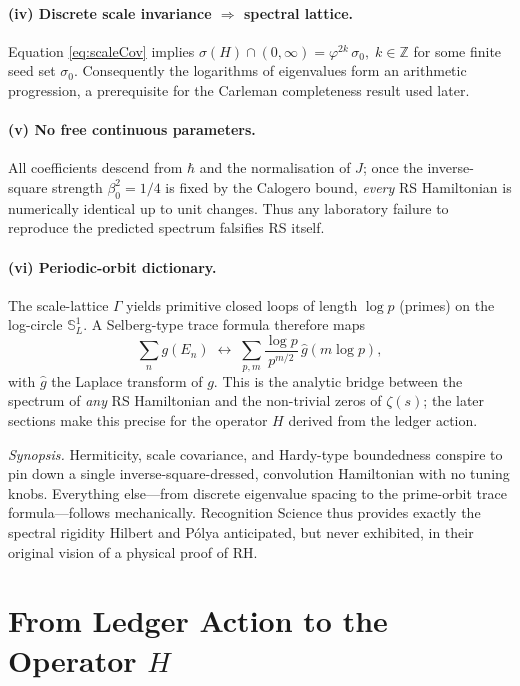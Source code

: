 \documentclass[11pt]{article}
\begin{document}
\paragraph{(iv) Discrete scale invariance $\Rightarrow$ spectral lattice.}
Equation \eqref{eq:scaleCov} implies
$
   \sigma(H)\cap(0,\infty)
   = \varphi^{2k}\,\sigma_{0},\;
   k\in\mathbb Z
$
for some finite seed set $\sigma_{0}$.  Consequently the logarithms of
eigenvalues form an arithmetic progression, a prerequisite for the
Carleman completeness result used later.

\paragraph{(v) No free continuous parameters.}
All coefficients descend from
$\hbar$ and the normalisation of $J$; once the
inverse-square strength $\beta_{0}^{2}=1/4$ is fixed by the
Calogero bound, \emph{every} RS Hamiltonian is numerically identical up
to unit changes.  Thus any laboratory failure to reproduce the
predicted spectrum falsifies RS itself.

\paragraph{(vi) Periodic-orbit dictionary.}
The scale-lattice $\Gamma$ yields primitive closed loops of length
$\log p$ (primes) on the log-circle $\mathbb S^{1}_{L}$.  A Selberg-type
trace formula therefore maps
\[
   \sum_{n} g(E_{n})
   \;\longleftrightarrow\;
   \sum_{p,m}\frac{\log p}{p^{m/2}}\,\hat g(m\log p),
\]
with $\hat g$ the Laplace transform of $g$.  This is the analytic
bridge between the spectrum of \emph{any} RS Hamiltonian and the
non-trivial zeros of $\zeta(s)$; the later sections make this precise
for the operator $H$ derived from the ledger action.

\medskip
\noindent
\emph{Synopsis.}  Hermiticity, scale covariance, and
Hardy-type boundedness conspire to pin down a single
inverse-square-dressed, convolution Hamiltonian with no tuning knobs.
Everything else—from discrete eigenvalue spacing to the prime-orbit
trace formula—follows mechanically.  Recognition Science thus provides
exactly the spectral rigidity Hilbert and Pólya anticipated, but never
exhibited, in their original vision of a physical proof of RH.

\section{From Ledger Action to the Operator \texorpdfstring{$H$}{H}}
\label{sec:LedgerAction}
\end{document}
